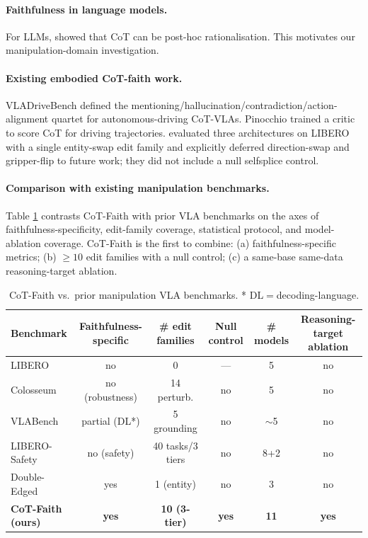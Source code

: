 \documentclass{article}
\begin{document}
\paragraph{Faithfulness in language models.}
For LLMs, \citet{turpin2023} showed that CoT can be post-hoc rationalisation. This motivates our manipulation-domain investigation.

\paragraph{Existing embodied CoT-faith work.}
VLADriveBench \citep{vladrivebench} defined the mentioning/hallucination/contradiction/action-alignment quartet for autonomous-driving CoT-VLAs. Pinocchio \citep{pinocchio} trained a critic to score CoT for driving trajectories. \citet{doubleedged} evaluated three architectures on LIBERO with a single entity-swap edit family and explicitly deferred direction-swap and gripper-flip to future work; they did not include a null selfsplice control.

\paragraph{Comparison with existing manipulation benchmarks.} Table \ref{tab:compare} contrasts CoT-Faith with prior VLA benchmarks on the axes of faithfulness-specificity, edit-family coverage, statistical protocol, and model-ablation coverage. CoT-Faith is the first to combine: (a) faithfulness-specific metrics; (b) $\geq 10$ edit families with a null control; (c) a same-base same-data reasoning-target ablation.

\begin{table}[t]
\centering\small
\caption{CoT-Faith vs.\ prior manipulation VLA benchmarks. * DL$=$decoding-language.}
\label{tab:compare}
\begin{tabular}{l c c c c c}
\toprule
Benchmark & Faithfulness-specific & \# edit families & Null control & \# models & Reasoning-target ablation \\
\midrule
LIBERO \citep{libero} & no & 0 & --- & 5 & no \\
Colosseum \citep{colosseum} & no (robustness) & 14 perturb. & no & 5 & no \\
VLABench \citep{vlabench} & partial (DL*) & 5 grounding & no & $\sim$5 & no \\
LIBERO-Safety \citep{liberosafety} & no (safety) & 40 tasks/3 tiers & no & 8+2 & no \\
Double-Edged \citep{doubleedged} & yes & 1 (entity) & no & 3 & no \\
\midrule
\textbf{CoT-Faith (ours)} & \textbf{yes} & \textbf{10 (3-tier)} & \textbf{yes} & \textbf{11} & \textbf{yes} \\
\bottomrule
\end{tabular}
\end{table}
\end{document}
